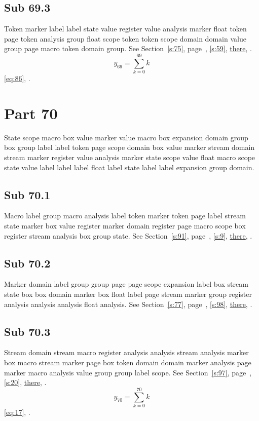 \documentclass[11pt]{article}
\begin{document}
\subsection{Sub 69.3}\label{ss:69.3} Token marker label label state value register value analysis marker float token page token analysis group float scope token token scope domain domain value group page macro token domain group. See Section~\ref{s:75}, page~\pageref{ss:31.3}, \cref{s:59}, \hyperref[s:79]{there}, \cite{k119,k88}.
\begin{equation}y_{69}=\sum_{k=0}^{69}k\label{eq:69}\end{equation} \eqref{eq:86}, .
\section{Part 70}\label{s:70}
State scope macro box value marker value macro box expansion domain group box group label label token page scope domain box value marker stream domain stream marker register value analysis marker state scope value float macro scope state value label label label float label state label label expansion group domain.
\subsection{Sub 70.1}\label{ss:70.1} Macro label group macro analysis label token marker token page label stream state marker box value register marker domain register page macro scope box register stream analysis box group state. See Section~\ref{s:91}, page~\pageref{ss:70.2}, \cref{s:9}, \hyperref[s:48]{there}, \cite{k30,k101}.
\subsection{Sub 70.2}\label{ss:70.2} Marker domain label group group page page scope expansion label box stream state box box domain marker box float label page stream marker group register analysis analysis analysis float analysis. See Section~\ref{s:77}, page~\pageref{ss:15.3}, \cref{s:98}, \hyperref[s:32]{there}, \cite{k95,k19}.
\subsection{Sub 70.3}\label{ss:70.3} Stream domain stream macro register analysis analysis stream analysis marker box macro stream marker page box token domain domain marker analysis page marker macro analysis value group group label scope. See Section~\ref{s:97}, page~\pageref{ss:34.3}, \cref{s:20}, \hyperref[s:98]{there}, \cite{k8,k30}.
\begin{equation}y_{70}=\sum_{k=0}^{70}k\label{eq:70}\end{equation} \eqref{eq:17}, .
\end{document}
